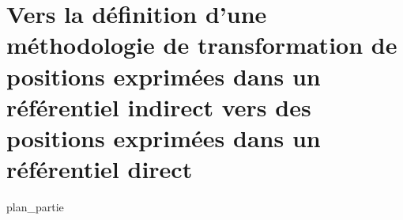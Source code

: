 \part{Vers la définition d'une méthodologie de transformation de positions exprimées dans un référentiel indirect vers des positions exprimées dans un référentiel direct}
\label{part:02}
{plan_partie}

